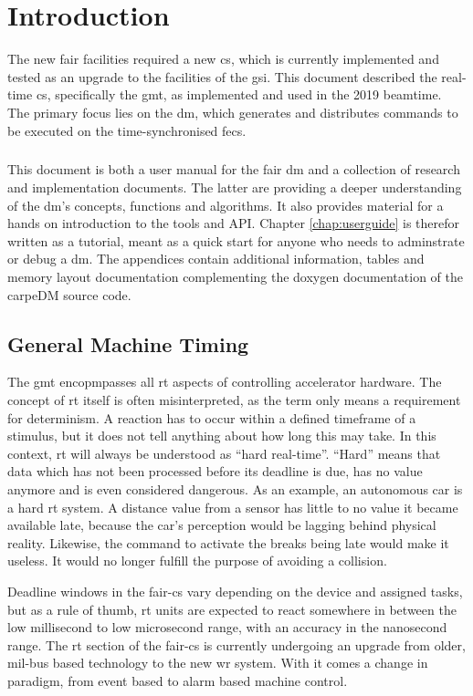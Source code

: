 
\chapter{Introduction}
\glsresetall


The new \gls{fair} facilities required a new \gls{cs}, which is currently implemented and tested as an upgrade to the facilities of the \gls{gsi}. This document described the real-time \gls{cs}, specifically the \gls{gmt}, as implemented and used in the 2019 beamtime. The primary focus lies on the \gls{dm}, which generates and distributes commands to be executed on the time-synchronised \gls{fec}s. 
\paragraph{}
This document is both a user manual for the \gls{fair} \gls{dm} and a collection of research and implementation documents. The latter are providing a deeper understanding of the \gls{dm}'s concepts, functions and algorithms. It also provides material for a hands on introduction to the tools and API. Chapter \ref{chap:userguide} is therefor written as a tutorial, meant as a quick start for anyone who needs to adminstrate or debug a \gls{dm}. The appendices contain additional information, tables and memory layout documentation complementing the doxygen documentation of the carpeDM source code.

\section{General Machine Timing}

The \gls{gmt} encopmpasses all \gls{rt} aspects of controlling accelerator hardware. The concept of \gls{rt} itself is often misinterpreted, as the term only means a requirement for determinism. A reaction has to occur within a defined timeframe of a stimulus, but it does not tell anything about how long this may take. In this context, \gls{rt} will always be understood as \enquote{hard real-time}. \enquote{Hard} means that data which has not been processed before its deadline is due, has no value anymore and is even considered dangerous. As an example, an autonomous car is a hard \gls{rt} system. A distance value from a sensor has little to no value it became available late, because the car's perception would be lagging behind physical reality. Likewise, the command to activate the breaks being late would make it useless. It would no longer fulfill the purpose of avoiding a collision.
\par
Deadline windows in the \gls{fair}-\gls{cs} vary depending on the device and assigned tasks, but as a rule of thumb, \gls{rt} units are expected to react somewhere in between the low millisecond to low microsecond range, with an accuracy in the nanosecond range. The \gls{rt} section of the \gls{fair}-\gls{cs} is currently undergoing an upgrade from older, \gls{mil}-bus based technology to the new \gls{wr} system. With it comes a change in paradigm, from event based to alarm based machine control.

